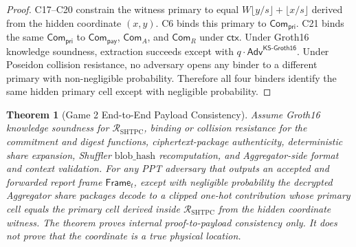 \documentclass[journal]{IEEEtran}
\theoremstyle{definition}
\theoremstyle{plain}
\newtheorem{theorem}{Theorem}
\begin{document}
\begin{proof}
  C17--C20 constrain the witness primary to equal
  $W\lfloor y/s\rfloor+\lfloor x/s\rfloor$ derived from the hidden
  coordinate $(x,y)$. C6 binds this primary to
  $\mathsf{Com}_{\mathsf{pri}}$. C21 binds the same
  $\mathsf{Com}_{\mathsf{pri}}$ to $\mathsf{Com}_{\mathsf{pay}}$,
  $\mathsf{Com}_{A}$, and $\mathsf{Com}_{R}$ under $\mathsf{ctx}$. Under Groth16
  knowledge soundness, extraction succeeds except with
  $q\cdot\mathsf{Adv}^{\mathsf{KS\text{-}Groth16}}$. Under Poseidon collision
  resistance, no adversary opens any binder to a different primary with
  non-negligible probability. Therefore all four binders identify the same
  hidden primary cell except with negligible probability.
\end{proof}

\begin{theorem}[Game 2 End-to-End Payload Consistency]
  \label{thm:payload-binding}
  Assume Groth16 knowledge soundness for
  \(\mathcal{R}_{\mathrm{SHTPC}}\), binding or collision resistance for the
  commitment and digest functions, ciphertext-package authenticity, deterministic
  share expansion, Shuffler \(\mathrm{blob\_hash}\) recomputation, and
  Aggregator-side format and context validation. For any PPT adversary that
  outputs an accepted and forwarded report frame \(\mathsf{Frame}_t\), except
  with negligible probability the decrypted Aggregator share packages decode to
  a clipped one-hot contribution whose primary cell equals the primary cell
  derived inside \(\mathcal{R}_{\mathrm{SHTPC}}\) from the hidden coordinate
  witness. The theorem proves internal proof-to-payload consistency only. It
  does not prove that the coordinate is a true physical location.
\end{theorem}
\end{document}
